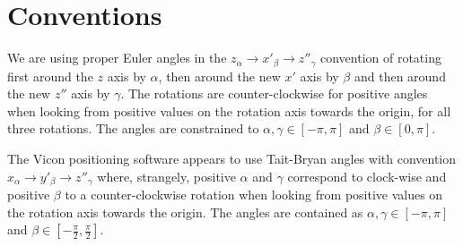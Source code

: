 \documentclass{article}
\begin{document}
\section{Conventions}
We are using proper Euler angles in the $z_\alpha \rightarrow x'_\beta
\rightarrow z''_\gamma$ convention of rotating first around the $z$
axis by $\alpha$, then around the new $x'$ axis by $\beta$ and then
around the new $z''$ axis by $\gamma$. The rotations are
counter-clockwise for positive angles when looking from
positive values on the rotation axis towards the origin, for all three
rotations. The angles are constrained to $\alpha, \gamma \in [-\pi, \pi]$ and $\beta \in [0, \pi]$.

The Vicon positioning software appears to use Tait-Bryan angles with
convention $x_\alpha \rightarrow y'_\beta \rightarrow z''_\gamma$
where, strangely, positive $\alpha$ and $\gamma$ correspond to
clock-wise and positive $\beta$ to a counter-clockwise rotation when
looking from positive values on the rotation axis towards the origin. The angles are contained as $\alpha, \gamma \in [-\pi, \pi]$ and $\beta \in [-\frac{\pi}{2}, \frac{\pi}{2}]$.
\end{document}
